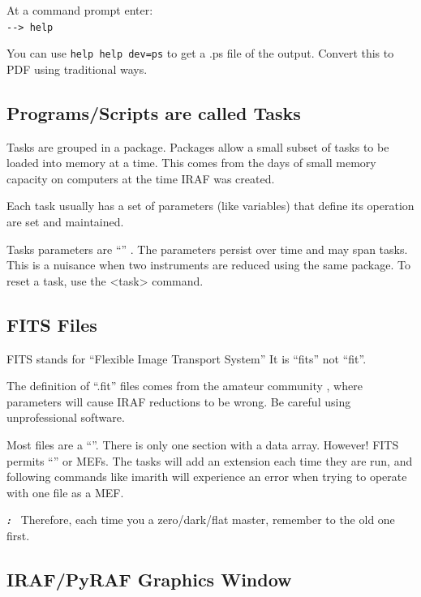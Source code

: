 At a command prompt enter:\\
   \verb=--> help =

You can use {\color{verbcolor}\verb/help help dev=ps/} to get a .ps file of the output. Convert this
to PDF using traditional ways.

\subsection{Programs/Scripts are called Tasks}

Tasks are grouped in a \gls{package}. Packages allow a small subset of
tasks to be loaded into memory at a time. This comes from the days of
small memory capacity on computers at the time IRAF was created.

Each \gls{task} usually has a set of \gls{parameters} (like variables)
that define its operation are set and maintained.

Tasks parameters are ``'' . The parameters
persist over time and may span tasks. This is a nuisance when two instruments are
reduced using the same package. To reset a task, use the  <task>
command.

\subsection{FITS Files}

FITS stands for ``Flexible Image Transport System'' It is ``fits'' not ``fit''.

The definition of ``.fit'' files comes from the amateur community \cite{SBFITSEXT}, where parameters
will cause IRAF reductions to be wrong. Be careful using unprofessional software.

Most files are a ``''. There is only one section with
a data array. However! FITS permits ``'' or MEFs.
The  tasks will add an extension each time they are run, and following
commands like imarith will experience an error when trying to operate with one
file as a MEF. 

\textbf{\emph{\color{verbcolor}{Takeaway} :}~ }
Therefore, each time you  a zero/dark/flat master, remember
to  the old one first.

\clearpage
\subsection{IRAF/PyRAF Graphics Window}

